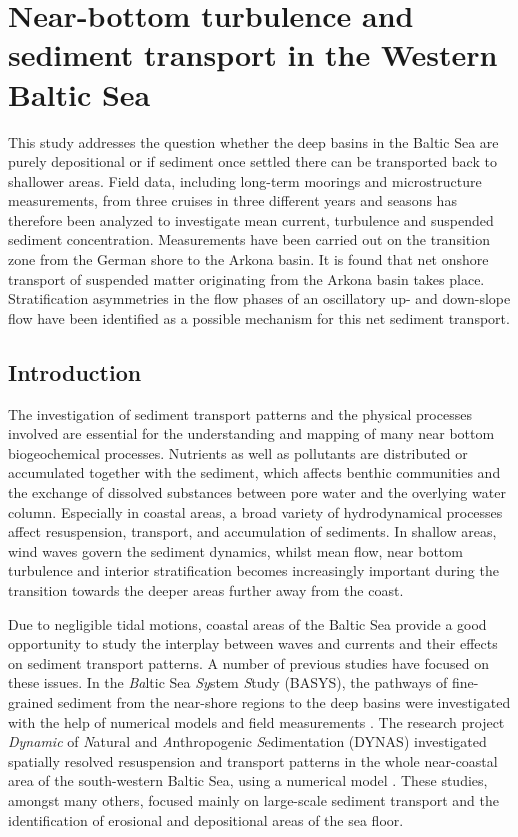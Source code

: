 \chapter{Near-bottom turbulence and sediment transport in the Western Baltic 
Sea}
\label{kap-measure}

This study addresses the question whether the deep basins in the Baltic Sea are 
purely depositional or if sediment once settled there can be transported back 
to shallower areas. Field data, including long-term moorings and 
microstructure measurements, from three cruises in three different years 
and seasons has therefore been analyzed to investigate mean current, turbulence 
and suspended sediment concentration. Measurements have been carried out on the 
transition zone from the German shore to the Arkona basin. It is found that 
net onshore transport of suspended matter originating from the Arkona basin 
takes place. Stratification asymmetries in the flow phases of an oscillatory 
up- and down-slope flow have been identified as a possible mechanism for this 
net sediment transport.

\section{Introduction}

The investigation of sediment transport patterns and the physical processes 
involved are essential for the understanding and mapping of many near bottom 
biogeochemical processes. Nutrients as well as pollutants are distributed or 
accumulated together with the sediment, which affects benthic communities and 
the exchange of dissolved substances between pore water and the overlying 
water column. Especially in coastal areas, a broad variety of hydrodynamical 
processes affect resuspension, transport, and accumulation of sediments. In 
shallow areas, wind waves govern the sediment dynamics, whilst mean flow, near 
bottom turbulence and interior stratification becomes increasingly important 
during the transition towards the deeper areas further away from the coast.

Due to negligible tidal motions, coastal areas of the Baltic 
Sea provide a good opportunity to study the interplay between waves and 
currents and their effects on sediment transport patterns. A number of previous 
studies have focused on these issues.
In the \textit{Ba}ltic Sea \textit{Sy}stem \textit{S}tudy (BASYS), the 
pathways of fine-grained sediment from the near-shore regions to the deep 
basins were investigated with the help of numerical models and field 
measurements \citep[][]{basys1, basys2, leipe2000}. The research project 
\textit{Dynamic} of \textit{N}atural and \textit{A}nthropogenic 
\textit{S}edimentation (DYNAS) investigated spatially resolved 
resuspension and transport patterns in the whole near-coastal area of the 
south-western Baltic Sea, using a numerical model 
\citep[][]{dynas1, dynas2}. These studies, amongst many others, focused mainly 
on large-scale sediment transport and the identification of erosional and 
depositional areas of the sea floor. 

